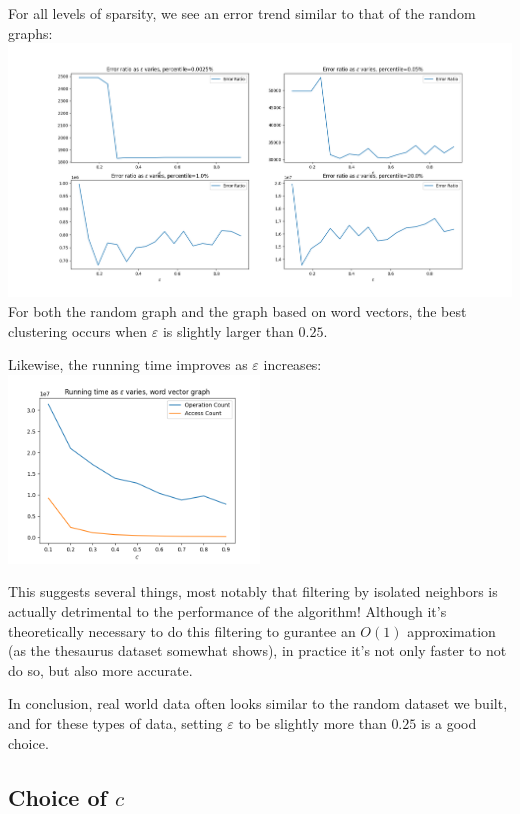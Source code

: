 \documentclass[
]{article}
\begin{document}
For all levels of sparsity, we see an error trend similar to that of the
random graphs:\\
\includegraphics[width=\textwidth]{images/percentile_change.png}\\
For both the random graph and the graph based on word vectors, the best
clustering occurs when {\(\varepsilon\)} is slightly larger than
  {\(0.25\)}.

Likewise, the running time improves as {\(\varepsilon\)} increases:\\
\includegraphics[width=0.5\textwidth]{images/running_time_as_eps_varies_word_vector.png}

This suggests several things, most notably that filtering by isolated
neighbors is actually detrimental to the performance of the algorithm!
Although it's theoretically necessary to do this
filtering to gurantee an {\(O(1)\)} approximation (as the thesaurus
dataset somewhat shows), in practice it's not only
faster to not do so, but also more accurate.

In conclusion, real world data often looks similar to the random dataset
we built, and for these types of data, setting {\(\varepsilon\)} to be
slightly more than {\(0.25\)} is a good choice.

\hypertarget{choice-of-c}{%
  \subsection{\texorpdfstring{Choice of
        {\(c\)}}{Choice of c}}\label{choice-of-c}}
\end{document}
